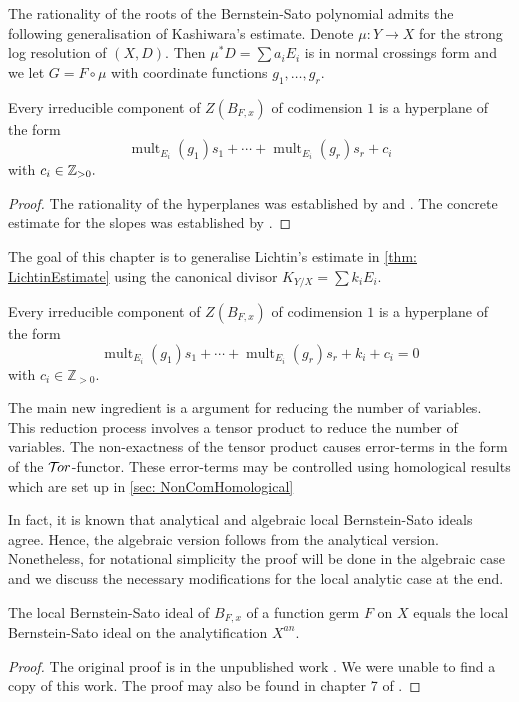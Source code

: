 The rationality of the roots of the Bernstein-Sato polynomial admits the following generalisation of Kashiwara's estimate.
Denote $\mu:Y\to X$ for the strong log resolution of $(X,D)$.
Then $\mu^*D = \sum a_i E_i$ is in normal crossings form and we let $G = F\circ \mu$ with coordinate functions $g_1,\ldots, g_r$.
\begin{theorem}\label{thm: Slopes}
  Every irreducible component of $Z(B_{F,x})$ of codimension $1$ is a hyperplane of the form
  $$\operatorname{mult}_{E_i}(g_1) s_1 + \cdots + \operatorname{mult}_{E_i}(g_r)s_r + c_i $$
  with $c_i\in \mathbb{Z}_{>0}.$
\end{theorem}
\begin{proof}
  The rationality of the hyperplanes was established by \cite{sabbah1987proximite} and \cite{gyoja1993bernstein}.
  The concrete estimate for the slopes was established by \cite{budur2020zero}.
\end{proof}

The goal of this chapter is to generalise Lichtin's estimate in \cref{thm: LichtinEstimate} using the canonical divisor $K_{Y/X} = \sum k_i E_i$.
\begin{theorem}\label{thm: EstimateBernsteinSatoZeroLocust}
  Every irreducible component of $Z(B_{F,x})$ of codimension $1$ is a hyperplane of the form
  $$\operatorname{mult}_{E_i}(g_1) s_1 + \cdots + \operatorname{mult}_{E_i}(g_r)s_r + k_i + c_i=0$$
  with $c_i \in \mathbb{Z}_{> 0 }$.
\end{theorem}
The main new ingredient is a argument for reducing the number of variables.
This reduction process involves a tensor product to reduce the number of variables.
The non-exactness of the tensor product causes error-terms in the form of the $\mathcal{T}\mkern -3mu or$-functor.
These error-terms may be controlled using homological results which are set up in \cref{sec: NonComHomological}

In fact, it is known that analytical and algebraic local Bernstein-Sato ideals agree.
Hence, the algebraic version follows from the analytical version.
Nonetheless, for notational simplicity the proof will be done in the algebraic case and we discuss the necessary modifications for the local analytic case at the end.
\begin{theorem}\label{thm: AnalyticAlgebraic}
  The local Bernstein-Sato ideal of $B_{F,x}$ of a function germ $F$ on $X$ equals the local Bernstein-Sato ideal on the analytification $X^{an}$.
\end{theorem}
\begin{proof}
  The original proof is in the unpublished work \cite{brianccon2002remarques}.
  We were unable to find a copy of this work.
  The proof may also be found in chapter 7 of \cite{MasterThesisBSLocal}.
\end{proof}
